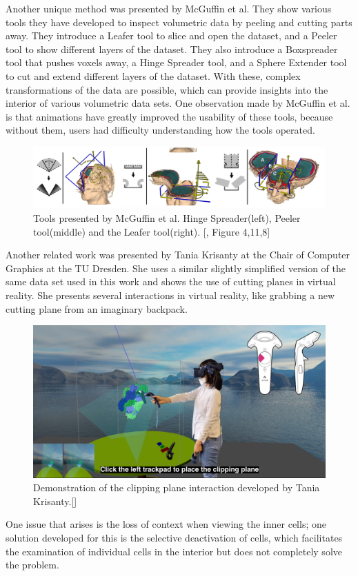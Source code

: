 Another unique method was presented by McGuffin et al.\cite{McGuffin}
They show various tools they have developed to inspect volumetric data by peeling and cutting parts away.
They introduce a Leafer tool to slice and open the dataset, and a Peeler tool to show different layers of the dataset. They also introduce a Boxspreader tool that pushes voxels away, a Hinge Spreader tool, and a Sphere Extender tool to cut and extend different layers of the dataset.
With these, complex transformations of the data are possible, which can provide insights into the interior of various volumetric data sets.
One observation made by McGuffin et al. is that animations have greatly improved the usability of these tools, because without them, users had difficulty understanding how the tools operated. 
\begin{figure}[h]
	\centering
	\includegraphics[width=1\linewidth]{fig/Images/McGuffin_fig_4_fig11_fig8}
	\caption[]{Tools presented by McGuffin et al. Hinge Spreader(left), Peeler tool(middle) and the Leafer tool(right). [\cite{McGuffin}, Figure 4,11,8]}
\end{figure}

Another related work was presented by Tania Krisanty at the Chair of Computer Graphics at the TU Dresden. She uses a similar slightly simplified version of the same data set used in this work and shows the use of cutting planes in virtual reality.\cite{krisanty_2022}
She presents several interactions in virtual reality, like grabbing a new cutting plane from an imaginary backpack. 
\begin{figure}
	\centering
	\includegraphics[width=1\linewidth]{fig/Images/Krisanty_clipping}
	\caption[]{Demonstration of the clipping plane interaction developed by Tania Krisanty.[\cite{krisanty_2022}]}
\end{figure}
One issue that arises is the loss of context when viewing the inner cells; one solution developed for this is the selective deactivation of cells, which facilitates the examination of individual cells in the interior but does not completely solve the problem.

